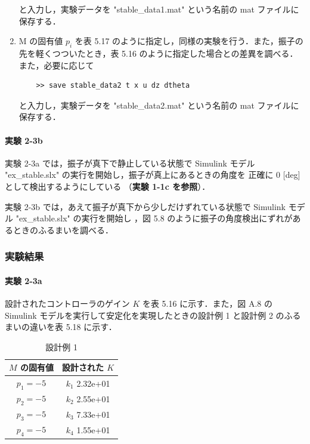\begin{enumerate}
        と入力し，実験データを "stable\_data1.mat" という名前の mat ファイルに保存する．
        
  \item M の固有値 \( p_i \) を表 5.17 のように指定し，同様の実験を行う．また，振子の先を軽くつついたとき，表 5.16 のように指定した場合との差異を調べる．また，必要に応じて
        
        \begin{tcolorbox}[colback=gray!5!white,colframe=gray!75!black]
          \begin{lstlisting}
    >> save stable_data2 t x u dz dtheta
    \end{lstlisting}
        \end{tcolorbox}
        
        と入力し，実験データを "stable\_data2.mat" という名前の mat ファイルに保存する．
\end{enumerate}

\paragraph{実験 2-3b}
実験 2-3a では，振子が真下で静止している状態で Simulink モデル 
"ex\_stable.slx" の実行を開始し，振子が真上にあるときの角度を
正確に 0 [deg] として検出するようにしている
（\textbf{実験 1-1c を参照}）．

実験 2-3b では，あえて振子が真下から少しだけずれている状態で
Simulink モデル "ex\_stable.slx" の実行を開始し
，図 5.8 のように振子の角度検出にずれがあるときのふるまいを調べる．

\subsubsection{実験結果}

\paragraph{実験 2-3a}
設計されたコントローラのゲイン \( K \) を表 5.16 に示す．また，図 A.8 の Simulink モデルを実行して安定化を実現したときの設計例 1 と設計例 2 のふるまいの違いを表 5.18 に示す．

\begin{table}[h]
  \centering
  \caption{設計例 1}
  \label{tab:design_example_1}
  \begin{tabular}{|c|c|}
    \hline
    \( M \) の固有値 & 設計された \( K \)  \\
    \hline
    \( p_1 = -5 \)   & \( k_1 \) 2.32e+01  \\
    \( p_2 = -5 \)   & \( k_2 \) 2.55e+01  \\
    \( p_3 = -5 \)   & \( k_3 \)  7.33e+01 \\
    \( p_4 = -5 \)   & \( k_4 \)  1.55e+01 \\
    \hline
  \end{tabular}
\end{table}

